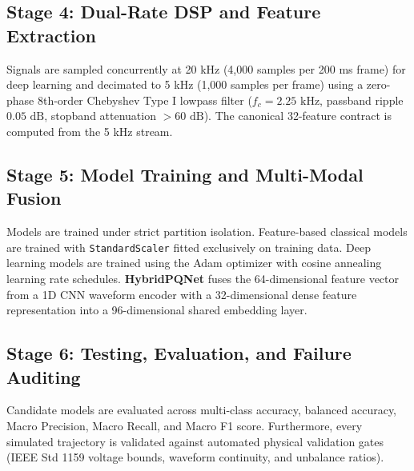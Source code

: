 \documentclass[12pt,a4paper]{report}
\begin{document}
\subsection{Stage 4: Dual-Rate DSP and Feature Extraction}
Signals are sampled concurrently at 20 kHz (4,000 samples per 200 ms frame) for deep learning and decimated to 5 kHz (1,000 samples per frame) using a zero-phase 8th-order Chebyshev Type I lowpass filter ($f_c = 2.25\text{ kHz}$, passband ripple $0.05\text{ dB}$, stopband attenuation $>60\text{ dB}$). The canonical 32-feature contract is computed from the 5 kHz stream.

\subsection{Stage 5: Model Training and Multi-Modal Fusion}
Models are trained under strict partition isolation. Feature-based classical models are trained with \texttt{StandardScaler} fitted exclusively on training data. Deep learning models are trained using the Adam optimizer with cosine annealing learning rate schedules. \textbf{HybridPQNet} fuses the 64-dimensional feature vector from a 1D CNN waveform encoder with a 32-dimensional dense feature representation into a 96-dimensional shared embedding layer.

\subsection{Stage 6: Testing, Evaluation, and Failure Auditing}
Candidate models are evaluated across multi-class accuracy, balanced accuracy, Macro Precision, Macro Recall, and Macro F1 score. Furthermore, every simulated trajectory is validated against automated physical validation gates (IEEE Std 1159 voltage bounds, waveform continuity, and unbalance ratios).
\end{document}
